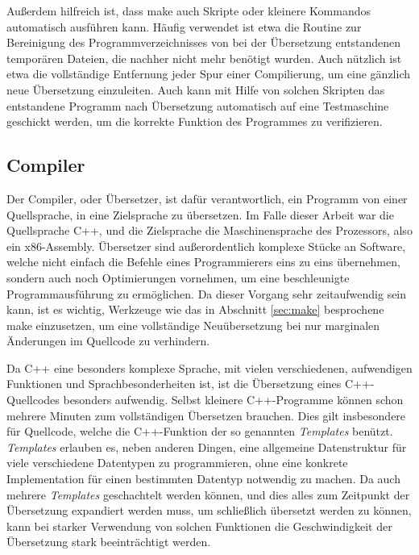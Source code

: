 Außerdem hilfreich ist, dass make auch Skripte oder kleinere Kommandos automatisch ausführen kann. Häufig verwendet ist etwa die Routine zur Bereinigung des Programmverzeichnisses von bei der
Übersetzung entstandenen temporären Dateien, die nachher nicht mehr benötigt wurden. Auch nützlich ist etwa die vollständige Entfernung jeder Spur einer Compilierung, um eine gänzlich neue
Übersetzung einzuleiten. Auch kann mit Hilfe von solchen Skripten das entstandene Programm nach Übersetzung automatisch auf eine Testmaschine geschickt werden, um die korrekte Funktion
des Programmes zu verifizieren.

\subsection{Compiler}
\label{sec:compiler}
Der Compiler, oder Übersetzer, ist dafür verantwortlich, ein Programm von einer Quellsprache, in eine Zielsprache zu übersetzen. Im Falle dieser Arbeit war die Quellsprache C++, und die
Zielsprache die Maschinensprache des Prozessors, also ein x86-Assembly. Übersetzer sind außerordentlich komplexe Stücke an Software, welche nicht einfach die Befehle eines Programmierers eins zu
eins übernehmen, sondern auch noch Optimierungen vornehmen, um eine beschleunigte Programmausführung zu ermöglichen. Da dieser Vorgang sehr zeitaufwendig sein kann, ist es wichtig, Werkzeuge wie
das in Abschnitt \ref{sec:make} besprochene make einzusetzen, um eine vollständige Neuübersetzung bei nur marginalen Änderungen im Quellcode zu verhindern. 

Da C++ eine besonders komplexe Sprache, mit vielen verschiedenen, aufwendigen Funktionen und Sprachbesonderheiten ist, ist die Übersetzung eines C++-Quellcodes besonders aufwendig. Selbst kleinere
C++-Programme können schon mehrere Minuten zum vollständigen Übersetzen brauchen. Dies gilt insbesondere für Quellcode, welche die C++-Funktion der so genannten \textit{Templates} benützt. \textit{Templates}
erlauben es, neben anderen Dingen, eine allgemeine Datenstruktur für viele verschiedene Datentypen zu programmieren, ohne eine konkrete Implementation für einen bestimmten Datentyp notwendig zu machen.
Da auch mehrere \textit{Templates} geschachtelt werden können, und dies alles zum Zeitpunkt der Übersetzung expandiert werden muss, um schließlich übersetzt werden zu können, kann bei starker Verwendung
von solchen Funktionen die Geschwindigkeit der Übersetzung stark beeinträchtigt werden.

